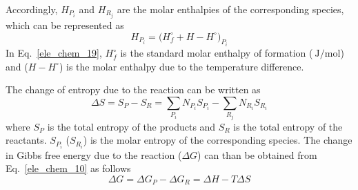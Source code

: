 \documentclass[12pt,a4paper]{scrartcl}
\begin{document}
\begin{onehalfspace}
Accordingly, $H_{P_i}$ and $H_{R_j}$ are the molar enthalpies of the corresponding species, which can be represented as
\begin{equation}\label{ele_chem_19}
	H_{P_i}=\Big(H_f^\circ+H-H^\circ\Big)_{P_i}
\end{equation}
In Eq.~\eqref{ele_chem_19}, $H_f^\circ$ is the standard molar enthalpy of formation ($\SI{}{\joule\per\mole}$) and ($H-H^\circ$) is the molar enthalpy due to the temperature difference.

The change of entropy due to the reaction can be written as
\begin{equation}\label{ele_chem_20}
	\Delta S = S_P-S_R = \sum_{P_i}N_{P_i}S_{P_i}-\sum_{R_j}N_{R_i}S_{R_i}
\end{equation}
where $S_P$ is the total entropy of the products and $S_R$ is the total entropy of the reactants. $S_{P_i}$ ($S_{R_i}$) is the molar entropy of the corresponding species. The change in Gibbs free energy due to the reaction ($\Delta G$) can than be obtained from Eq.~\eqref{ele_chem_10} as follows
\begin{equation}\label{ele_chem_21}
	\Delta G = \Delta G_P - \Delta G_R=\Delta H-T\Delta S
\end{equation}


\end{onehalfspace}
\end{document}
